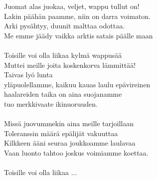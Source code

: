 
Juomat alas juokaa, veljet, wappu tullut on!\\
Lakin päähän paamme, niin on darra voimaton.\\
Arki pysähtyy, duunit malttaa odottaa.\\
Me emme jäädy vaikka arktis satais päälle maan\\
\hspace{10mm} \\
Toisille voi olla liikaa kylmä wappusää \\
Muttei meille joita koskenkorva lämmittää! \\
Taivas lyö lunta \\
yläpuolellamme, kaikuu kauas laulu epävireinen \\
haalareiden taika on aina suojanamme \\
tuo merkkivaate ikinuoruuden. \\
\hspace{10mm} \\

Missä juovummekin aina meille tarjoillaan\\
Toleranssin määrä epälijät vakuuttaa\\
Kilkkeen ääni seuraa joukkoamme laulavaa\\
Vaan luonto tahtoo joskus voimiamme koettaa.\\
\hspace{10mm} \\
Toisille voi olla liikaa ...